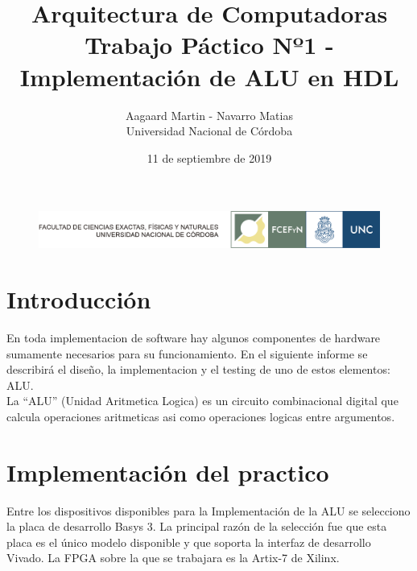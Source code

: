 \documentclass[12pt,A4paper,titlepage]{article}
\begin{document}
\renewcommand{\tablename}{Tabla}
\large

\title{Arquitectura de Computadoras \\
\large Trabajo Páctico Nº1 - Implementación de ALU en HDL}
\author{Aagaard Martin - Navarro Matias\\ Universidad Nacional de Córdoba \bigskip
  \bigskip}

\date{11 de septiembre de 2019}

\begin{titlepage}
\center


\begin{figure}[h]
    \centering
    \includegraphics[scale=0.8]{figure/logos-fcefyn-y-unc.png}
    \label{fig:unc-logo}
\end{figure}

{\let\newpage\relax\maketitle}
\center
\end{titlepage}

\maketitle %
\tableofcontents %
\newpage

\section{Introducción}
En toda implementacion de software hay algunos componentes de hardware sumamente necesarios para su funcionamiento. En el siguiente informe se describirá el diseño, la implementacion y el testing de uno de estos elementos: ALU. \\
La  ``ALU'' (Unidad Aritmetica Logica) es un circuito combinacional digital que calcula operaciones aritmeticas asi como operaciones logicas entre argumentos.

\section{Implementación del practico}
Entre los dispositivos disponibles para la Implementación de la ALU se selecciono la placa de desarrollo Basys 3. La principal razón de la selección fue que esta placa es el único modelo disponible y que soporta la interfaz de desarrollo Vivado. La FPGA sobre la que se trabajara es la Artix-7 de Xilinx.
\end{document}
